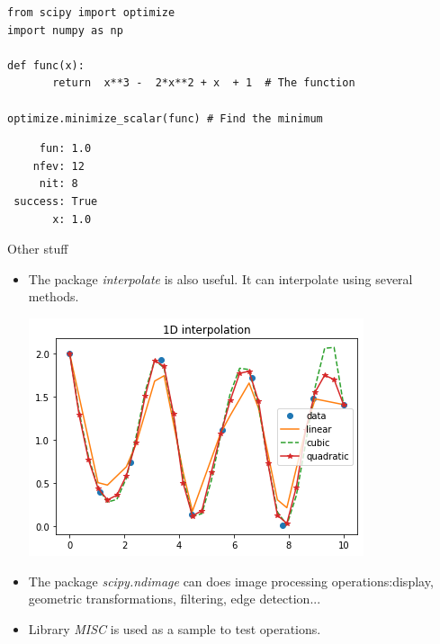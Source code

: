 \documentclass{beamer}
\begin{document}
\begin{frame}[fragile]{}

\begin{lstlisting}
from scipy import optimize
import numpy as np

def func(x):
       return  x**3 -  2*x**2 + x  + 1  # The function

optimize.minimize_scalar(func) # Find the minimum
\end{lstlisting}

\begin{verbatim}
     fun: 1.0
    nfev: 12
     nit: 8
 success: True
       x: 1.0
\end{verbatim}
\end{frame}
\begin{frame}{Other stuff}
\begin{itemize}
    \item The package \emph{interpolate} is also useful. It can interpolate using several methods. 
    \begin{center}
\includegraphics[scale=0.5]{Module 3 (Python tools)/pics/interpolation.png}

\end{center}
    \item The package \emph{scipy.ndimage} can does image processing operations:display, geometric transformations, filtering, edge detection... 
    \item  Library \emph{MISC} is used as a sample to test operations.
\end{itemize}    
\end{frame}
\end{document}
